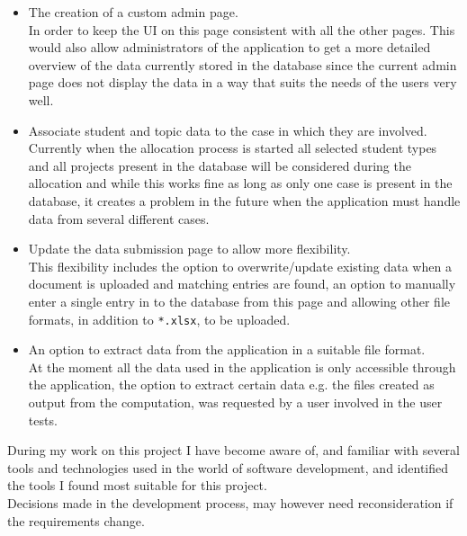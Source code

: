 \begin{itemize}
	\item The creation of a custom admin page.\\
	In order to keep the UI on this page consistent with all the other pages. This would also allow administrators of the application to get a more detailed overview of the data currently stored in the database since the current admin page does not display the data in a way that suits the needs of the users very well.
	\item Associate student and topic data to the case in which they are involved.\\
	Currently when the allocation process is started all selected student types and all projects present in the database will be considered during the allocation and while this works fine as long as only one case is present in the database, it creates a problem in the future when the application must handle data from several different cases.
	\item Update the data submission page to allow more flexibility.\\
	This flexibility includes the option to overwrite/update existing data when a document is uploaded and matching entries are found, an option to manually enter a single entry in to the database from this page and allowing other file formats, in addition to \verb|*.xlsx|, to be uploaded.
	\item An option to extract data from the application in a suitable file format.\\
	At the moment all the data used in the application is only accessible through the application, the option to extract certain data e.g. the files created as output from the computation, was requested by a user involved in the user tests.
\end{itemize}
During my work on this project I have become aware of, and familiar with several tools and technologies used in the world of software development, and identified the tools I found most suitable for this project.\\Decisions made in the development process, may however need reconsideration if the requirements change.